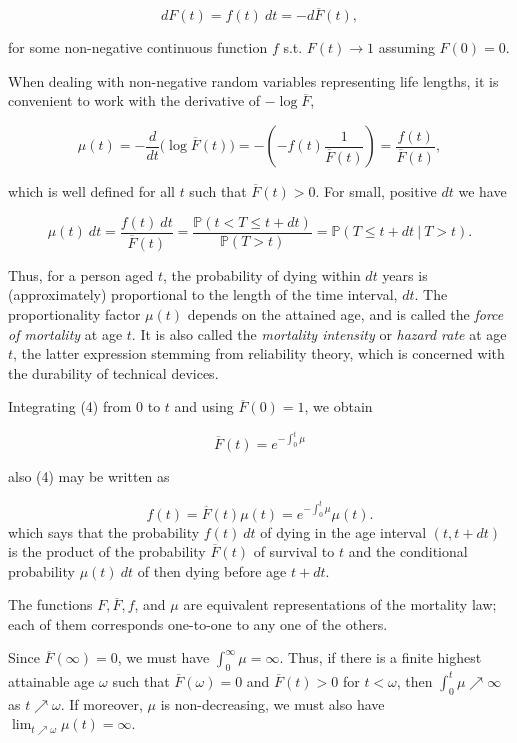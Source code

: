 \documentclass[a4paper,12pt,openany]{book}
\begin{document}
\[
dF(t)=f(t)\ dt=-d\overline F(t),\tag{3}
\]

for some non-negative continuous function \(f\) s.t. \(F(t)\to 1\) assuming \(F(0)=0\).

When dealing with non-negative random variables representing life lengths, it is convenient to work with the derivative of \(-\log \overline F\),

\[
\mu(t)=-\frac{d}{dt}\Big(\log \overline F(t)\Big)=-\left(-f(t)\frac{1}{\overline F(t)}\right)=\frac{f(t)}{\overline F(t)},\tag{4}
\]

which is well defined for all \(t\) such that \(\overline F(t) > 0\). For small, positive \(dt\) we have

\[
\mu(t)\ dt=\frac{f(t)\ dt}{\overline F(t)}=\frac{\mathbb P(t< T\le t+dt)}{\mathbb P(T> t)}=\mathbb P(T\le t+dt\ \vert\ T> t).\tag{5}
\]

Thus, for a person aged \(t\), the probability of dying within \(dt\) years is (approximately) proportional to the length of the time interval, \(dt\). The proportionality factor \(\mu (t)\) depends on the attained age, and is called the \emph{force of mortality} at age \(t\). It is also called the \emph{mortality intensity} or \emph{hazard rate} at age \(t\), the latter expression stemming from reliability theory, which is concerned with the durability of technical devices.

Integrating (4) from 0 to \(t\) and using \(\overline F(0) = 1\), we obtain

\[
\overline F(t)=e^{-\int_0^t\mu}\tag{6}
\]

also (4) may be written as

\[
f(t)=\overline F(t)\mu(t)=e^{-\int_0^t\mu}\mu(t).\tag{7}
\]
which says that the probability \(f (t)\ dt\) of dying in the age interval \((t, t + dt)\) is the product of the probability \(\overline F(t)\) of survival to \(t\) and the conditional probability \(\mu(t)\ dt\) of then dying before age \(t + dt\).

The functions \(F,\overline F, f\), and \(\mu\) are equivalent representations of the mortality law; each of them corresponds one-to-one to any one of the others.

Since \(\overline F(\infty) = 0\), we must have \(\int_0^\infty \mu=\infty\). Thus, if there is a finite highest attainable age \(\omega\) such that \(\overline F(\omega) = 0\) and \(\overline F(t) > 0\) for \(t < \omega\), then \(\int_0^t\mu\nearrow\infty\) as \(t\nearrow \omega\). If moreover, \(\mu\) is non-decreasing, we must also have \(\lim_{t\nearrow \omega}\mu(t)=\infty\).
\end{document}
